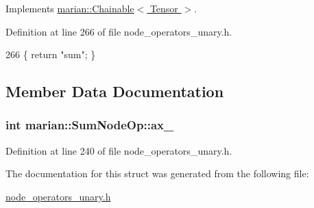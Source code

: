 Implements \hyperlink{classmarian_1_1Chainable_a2b7a5cbdac7a7d3bd7d781a6ff148fc3}{marian\+::\+Chainable$<$ Tensor $>$}.



Definition at line 266 of file node\+\_\+operators\+\_\+unary.\+h.


\begin{DoxyCode}
266 \{ \textcolor{keywordflow}{return} \textcolor{stringliteral}{"sum"}; \}
\end{DoxyCode}


\subsection{Member Data Documentation}
\subsubsection[{\texorpdfstring{ax\+\_\+}{ax_}}]{\setlength{\rightskip}{0pt plus 5cm}int marian\+::\+Sum\+Node\+Op\+::ax\+\_\+}\hypertarget{structmarian_1_1SumNodeOp_a3c4f67bef93557eb69f683587251eb4d}{}\label{structmarian_1_1SumNodeOp_a3c4f67bef93557eb69f683587251eb4d}


Definition at line 240 of file node\+\_\+operators\+\_\+unary.\+h.



The documentation for this struct was generated from the following file\+:\begin{DoxyCompactItemize}
\item 
\hyperlink{node__operators__unary_8h}{node\+\_\+operators\+\_\+unary.\+h}\end{DoxyCompactItemize}
